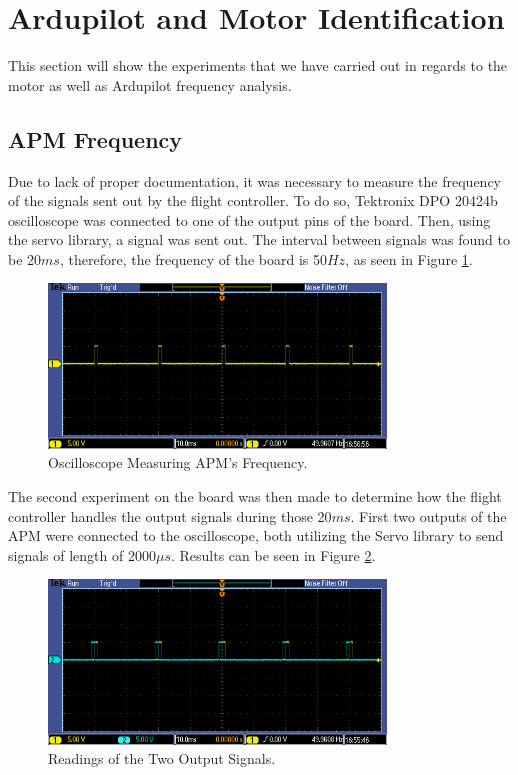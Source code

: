 \section{Ardupilot and Motor Identification}
This section will show the experiments that we have carried out in regards to the motor as well as Ardupilot frequency analysis.

\subsection{APM Frequency}
Due to lack of proper documentation, it was necessary to measure the frequency of the signals sent out by the flight controller. To do so, Tektronix DPO 20424b oscilloscope was connected to one of the output pins of the board. Then, using the servo library, a signal was sent out. The interval between signals was found to be 20$ms$, therefore, the frequency of the board is 50$Hz$, as seen in Figure \ref{oscillo1}.
\begin{figure}[H]
  \centering
    \includegraphics[width=0.8\textwidth]{images/oscillo1.png}
	\caption{Oscilloscope Measuring APM's Frequency.}
	\label{oscillo1}
\end{figure}

The second experiment on the board was then made to determine how the flight controller handles the output signals during those 20$ms$. First two outputs of the APM were connected to the oscilloscope, both utilizing the Servo library to send signals of length of 2000$\mu s$. Results can be seen in Figure \ref{oscillo2}.
\begin{figure}[H]
  \centering
    \includegraphics[width=0.8\textwidth]{images/oscillo2.png}
	\caption{Readings of the Two Output Signals.}
	\label{oscillo2}
\end{figure}

